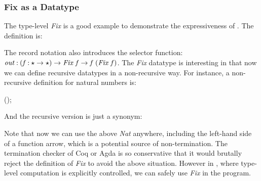 \subsubsection{Fix as a Datatype}
The type-level \emph{Fix} is a good example to demonstrate the
expressiveness of \sufcc. The definition is:
\resethooks
The record notation also introduces the selector function: \ensuremath{\Varid{out}\mathbin{:}(\Varid{f}\mathbin{:}\star\to \star)\to \Conid{Fix}\;\Varid{f}\to \Varid{f}\;(\Conid{Fix}\;\Varid{f})}.  The \emph{Fix} datatype is
interesting in that now we can define recursive datatypes in a
non-recursive way. For instance, a non-recursive definition for
natural numbers is:
\begin{hscode}\SaveRestoreHook
{}%
%
%
\>[3]{}\;\;(\mathbin{:}\star)\mathrel{=}\mid {}\;;{}\<[E]%
\ColumnHook
\end{hscode}\resethooks
And the recursive version is just a synonym:
\begin{hscode}\SaveRestoreHook
{}%
%
%
\>[3]{}\;\mathbin{:}\star\mathrel{=}\;\<[E]%
\ColumnHook
\end{hscode}\resethooks

Note that now we can use the above \emph{Nat} anywhere, including the
left-hand side of a function arrow, which is a potential source of
non-termination. The termination checker of Coq or Agda is so
conservative that it would brutally reject the definition of
\emph{Fix} to avoid the above situation. 
 However in \sufcc, where type-level computation is
explicitly controlled, we can safely use \emph{Fix} in the program.

